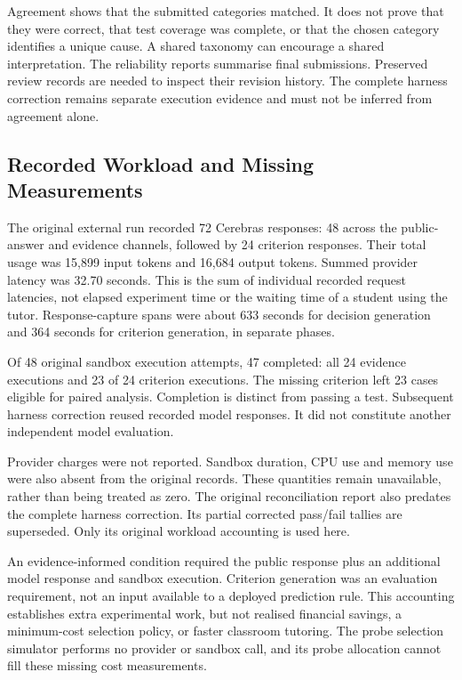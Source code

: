Agreement shows that the submitted categories matched. It does not prove that they were correct, that test coverage was complete,
or that the chosen category identifies a unique cause. A shared taxonomy can encourage a shared interpretation. The reliability
reports summarise final submissions. Preserved review records are needed to inspect their revision
history. The complete harness correction remains separate execution evidence and must not be inferred from agreement alone.

\subsection{Recorded Workload and Missing Measurements}

The original external run recorded 72 Cerebras responses: 48 across the public-answer and evidence channels, followed by
24 criterion responses. Their total usage was 15,899 input tokens and 16,684 output tokens. Summed provider latency was
32.70 seconds. This is the sum of individual recorded request latencies, not elapsed experiment time or the waiting time of a
student using the tutor. Response-capture spans were about 633 seconds for decision generation and 364 seconds for criterion
generation, in separate phases.

Of 48 original sandbox execution attempts, 47 completed: all 24 evidence executions and 23 of 24 criterion executions.
The missing criterion left 23 cases eligible for paired analysis. Completion is distinct from passing a test. Subsequent
harness correction reused recorded model responses. It did not constitute another independent model evaluation.

Provider charges were not reported. Sandbox duration, CPU use and memory use were also absent from the original records.
These quantities remain unavailable, rather than being treated as zero. The original reconciliation report also predates the
complete harness correction. Its partial corrected pass/fail tallies are superseded. Only its original workload accounting is
used here.

An evidence-informed condition required the public response plus an additional model response and sandbox execution. Criterion
generation was an evaluation requirement, not an input available to a deployed prediction rule. This accounting establishes
extra experimental work, but not realised financial savings, a minimum-cost selection policy, or faster classroom tutoring.
The probe selection simulator performs no provider or sandbox call, and its probe allocation cannot fill these missing cost measurements.

